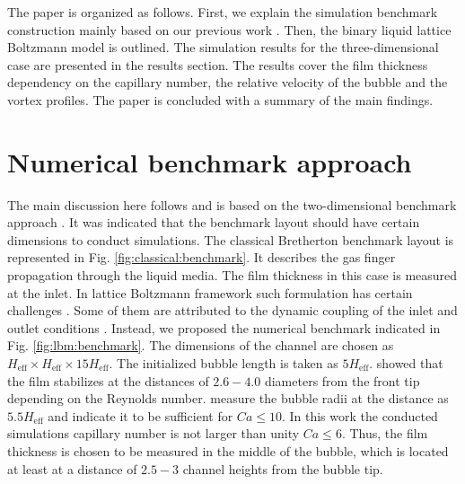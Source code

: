 \documentclass{article}
\begin{document}
The paper is organized as follows.  First, we explain the simulation benchmark construction
mainly based on our previous work \cite{kuzmin-binary2d}. Then, the binary liquid lattice
Boltzmann model is outlined. The simulation results for the three-dimensional case are presented in
the results section. The results cover the film thickness dependency on the capillary number, the
relative velocity of the bubble and the vortex profiles. The paper
is concluded with a summary of the main findings.

\section{Numerical benchmark approach}
\label{sec:numerical:benchmark}
The main discussion here follows and is based on the two-dimensional benchmark approach
\cite{kuzmin-binary2d}. It was indicated that the benchmark layout should have certain
dimensions to conduct simulations. The classical Bretherton benchmark layout is represented in Fig.
\ref{fig:classical:benchmark}. It describes the gas finger propagation through the liquid media.
The film thickness in this case is measured at the inlet. In lattice Boltzmann framework such
formulation has certain challenges \cite{kuzmin-binary2d}. Some of them are attributed to the
dynamic coupling of the inlet and outlet conditions \cite{giavedoni-numerical}. Instead, we
proposed the numerical benchmark indicated in Fig. \ref{fig:lbm:benchmark}. The dimensions of the
channel are chosen as $H_{\mathrm{eff}}\times H_{\mathrm{eff}} \times 15 H_{\mathrm{eff}}$. The
initialized bubble length is taken as $5 H_{\mathrm{eff}}$. \citet{giavedoni-numerical} showed that
the film stabilizes at the distances of $2.6-4.0$ diameters
from the front tip depending on the Reynolds number. \citet{heil-threedim} measure the bubble radii
at the distance as $5.5 H_{\mathrm{eff}}$ and indicate it to be sufficient for $Ca\leq 10$. In
this work the conducted simulations capillary number is not larger than unity $Ca\leq 6$.  Thus, the
film thickness is chosen to be measured in the
middle of the bubble, which is located at least at a distance of $2.5-3$ channel heights from the 
bubble tip.%
\end{document}
